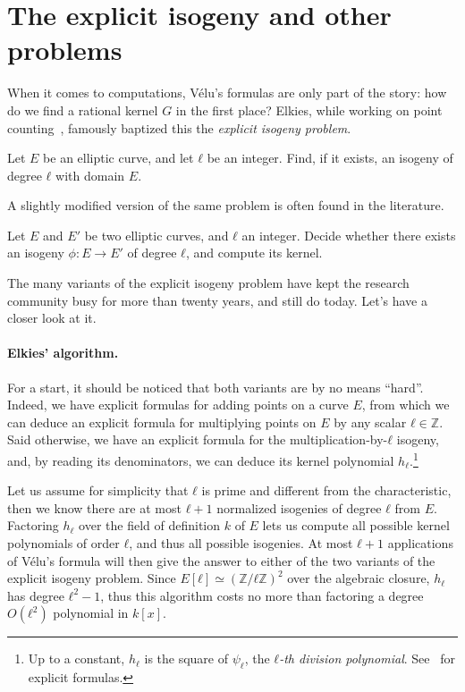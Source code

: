 \documentclass[b5layout]{hdr}
\begin{document}

\section{The explicit isogeny and other problems}

When it comes to computations, Vélu's formulas are only part of the
story: how do we find a rational kernel $G$ in the first place?
Elkies, while working on point counting~\cite{elkies92,elkies98},
famously baptized this the \emph{explicit isogeny problem}.

\begin{problem}
  \label{prob:expl-isog}
  Let $E$ be an elliptic curve, and let $ℓ$ be an integer. %
  Find, if it exists, an isogeny of degree $ℓ$ with domain $E$.
\end{problem}

A slightly modified version of the same problem is often found in the
literature.

\begin{problem}
  \label{prob:expl-isog-2}
  Let $E$ and $E'$ be two elliptic curves, and $ℓ$ an integer. %
  Decide whether there exists an isogeny $ϕ:E→ E'$ of degree $ℓ$,
  and compute its kernel.
\end{problem}

The many variants of the explicit isogeny problem have kept the
research community busy for more than twenty years, and still do
today. %
Let's have a closer look at it. %

\paragraph{Elkies' algorithm.}
For a start, it should be noticed that both variants are by no means
``hard''. %
Indeed, we have explicit formulas for adding points on a curve $E$,
from which we can deduce an explicit formula for multiplying points on
$E$ by any scalar $ℓ∈ℤ$. %
Said otherwise, we have an explicit formula for the
multiplication-by-$ℓ$ isogeny, and, by reading its denominators, we
can deduce its kernel polynomial $h_ℓ$.\footnote{Up to a constant,
  $h_ℓ$ is the square of $ψ_ℓ$, the \emph{$ℓ$-th division polynomial}.
  See~\cite[III.4]{blake+seroussi+smart} for explicit formulas.} %

Let us assume for simplicity that $ℓ$ is prime and different from the
characteristic, then we know there are at most $ℓ+1$ normalized
isogenies of degree $ℓ$ from $E$. %
Factoring $h_ℓ$ over the field of definition $k$ of $E$ lets us
compute all possible kernel polynomials of order $ℓ$, and thus all
possible isogenies. %
At most $ℓ+1$ applications of Vélu's formula will then give the answer
to either of the two variants of the explicit isogeny problem. %
Since $E[ℓ]≃(ℤ/ℓℤ)^2$ over the algebraic closure, $h_ℓ$ has degree
$ℓ^2-1$, thus this algorithm costs no more than factoring a degree
$O(ℓ^2)$ polynomial in $k[x]$. %
\end{document}
